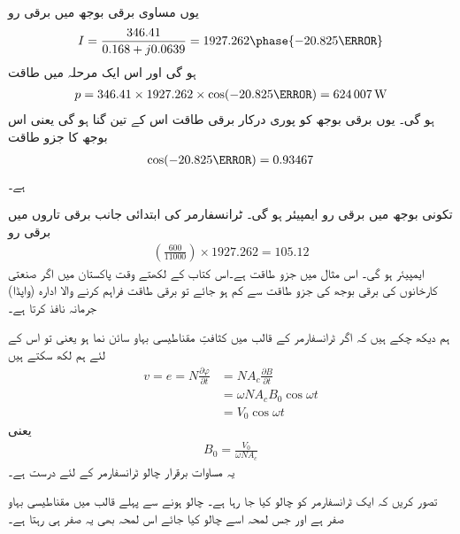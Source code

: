 یوں مساوی برقی بوجھ میں برقی رو
\begin{align*}
I=\frac{346.41}{0.168+j0.0639}=1927.262\phase{-20.825\degree}
\end{align*}
ہو گی اور اس ایک مرحلہ میں طاقت
\begin{align*}
p=346.41 \times 1927.262 \times \cos (-20.825\degree)=\SI{624007}{\watt}
\end{align*}
ہو گی۔ یوں برقی بوجھ کو پوری درکار برقی طاقت اس کے تین گنا ہو گی یعنی   اس بوجھ کا جزو طاقت 
\begin{align*}
\cos (-20.825\degree)=0.93467
\end{align*}
ہے۔

	تکونی بوجھ   میں برقی رو  ایمپیئر ہو گی۔ ٹرانسفارمر کی ابتدائی جانب برقی تاروں میں برقی رو
\begin{align*}
\left(\frac{600}{11000} \right) \times 1927.262=105.12
\end{align*}
  ایمپیئر ہو گی۔
%
اس مثال میں جزو طاقت  ہے۔اس کتاب کے لکھتے وقت پاکستان میں اگر صنعتی کارخانوں کی برقی بوجھ کی جزو طاقت  سے کم ہو جائے تو برقی طاقت فراہم کرنے والا ادارہ (واپڈا) جرمانہ نافذ کرتا ہے۔ 

ہم دیکھ چکے ہیں کہ اگر ٹرانسفارمر کے قالب میں کثافتِ مقناطیسی بہاو سائن نما ہو یعنی   تو اس کے لئے ہم لکھ سکتے ہیں
\begin{align*}
v=e=N \frac{\partial \varphi}{\partial t}&=N A_c \frac{\partial B}{\partial t}\\
&=\omega N A_c B_0 \cos \omega t\\
&=V_0 \cos \omega t
\end{align*}
یعنی
\begin{align}\label{مساوات_ٹرانسفارمر_درکار_کثافت_بہاو}
B_0=\frac{V_0}{\omega N A_c}
\end{align}
یہ مساوات برقرار چالو ٹرانسفارمر کے لئے درست ہے۔

تصور کریں کہ ایک ٹرانسفارمر کو چالو کیا جا رہا ہے۔ چالو ہونے سے پہلے قالب میں مقناطیسی بہاو صفر ہے اور جس لمحہ اسے چالو کیا جائے اس لمحہ بھی یہ صفر ہی رہتا ہے۔	

